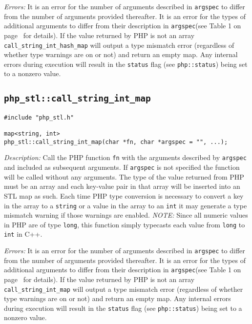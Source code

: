 \documentclass[11pt,titlepage]{article}
\begin{document}
\emph{Errors:} It is an error for the number of arguments described in \verb|argspec| to differ from the number of arguments provided thereafter. It is an error for the types of additional arguments to differ from their description in \verb|argspec|(see Table 1 on page~\pageref{Table1} for details). If the value returned by PHP is not an array \verb|call_string_int_hash_map| will output a type mismatch error (regardless of whether type warnings are on or not) and return an empty map. Any internal errors during execution will result in the \verb|status| flag (see \verb|php::status|) being set to a nonzero value.


\subsection{\texttt{php\_stl::call\_string\_int\_map}}

\begin{verbatim}
#include "php_stl.h"

map<string, int> 
php_stl::call_string_int_map(char *fn, char *argspec = "", ...);
\end{verbatim}

\emph{Description:} Call the PHP function \verb|fn| with the arguments described by \verb|argspec| and included as subsequent arguments. If \verb|argspec| is not specified the function will be called without any arguments. The type of the value returned from PHP must be an array and each key-value pair in that array will be inserted into an STL map as such. Each time PHP type conversion is necessary to convert a key in the array to a \verb|string| or a value in the array to an \verb|int| it may generate a type mismatch warning if those warnings are enabled. \emph{NOTE:} Since all numeric values in PHP are of type \verb|long|, this function simply typecasts each value from \verb|long| to \verb|int| in C++.

\emph{Errors:} It is an error for the number of arguments described in \verb|argspec| to differ from the number of arguments provided thereafter. It is an error for the types of additional arguments to differ from their description in \verb|argspec|(see Table 1 on page~\pageref{Table1} for details). If the value returned by PHP is not an array \verb|call_string_int_map| will output a type mismatch error (regardless of whether type warnings are on or not) and return an empty map. Any internal errors during execution will result in the \verb|status| flag (see \verb|php::status|) being set to a nonzero value.
\end{document}
